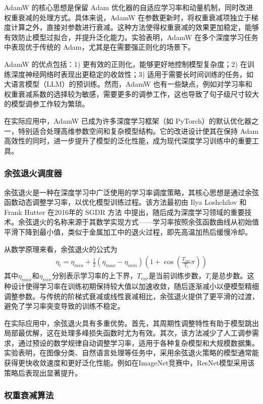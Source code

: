 AdamW 的核心思想是保留 Adam 优化器的自适应学习率和动量机制，同时改进权重衰减的处理方式。具体来说，AdamW 在参数更新时，将权重衰减项独立于梯度计算之外，直接对参数进行衰减。这种方法使得权重衰减的效果更加稳定，能够有效防止模型过拟合，并提升泛化能力。实验表明，AdamW 在多个深度学习任务中表现优于传统的 Adam，尤其是在需要强正则化的场景下。

AdamW 的优点包括：1) 更有效的正则化，能够更好地控制模型复杂度；2) 在训练深度神经网络时表现出更稳定的收敛性；3) 适用于需要长时间训练的任务，如大语言模型（LLM）的预训练。然而，AdamW 也有一些缺点，例如对学习率和权重衰减系数的选择较为敏感，需要更多的调参工作，这也导致了句子级尺寸较大的模型调参工作较为繁琐。

在实际应用中，AdamW 已成为许多深度学习框架（如 PyTorch）的默认优化器之一，特别适合处理高维参数空间和复杂模型结构。它的改进设计使其在保持 Adam 高效性的同时，进一步提升了模型的泛化性能，成为现代深度学习训练中的重要工具。

\subsubsection{余弦退火调度器}

余弦退火是一种在深度学习中广泛使用的学习率调度策略，其核心思想是通过余弦函数动态调整学习率，以优化模型训练过程。该方法最初由 Ilya Loshchilov 和 Frank Hutter 在2016年的 SGDR 方法 \cite{SGDR} 中提出，随后成为深度学习领域的重要技术。余弦退火的名称来源于其数学实现方式——学习率按照余弦函数曲线从初始值平滑下降到最小值，类似于金属加工中的退火过程，即先高温加热后缓慢冷却。

从数学原理来看，余弦退火的公式为
\begin{align}
\eta_t = \eta_{min} + \frac{1}{2}(\eta_{max} - \eta_{min})(1 + \cos(\frac{T_{cur}}{T_i}\pi))
\end{align}
其中$\eta_{max}$和$\eta_{min}$分别表示学习率的上下界，$T_{cur}$是当前训练步数，$T_i$是总步数。这种设计使得学习率在训练初期保持较大值以加速收敛，随后逐渐减小以便模型精细调整参数。与传统的阶梯式衰减或线性衰减相比，余弦退火提供了更平滑的过渡，避免了学习率突变导致的训练不稳定。

在实际应用中，余弦退火具有多重优势。首先，其周期性调整特性有助于模型跳出局部最优解，这在处理多峰损失函数时尤为有效。其次，该方法减少了人工调参需求，通过预设的数学规律自动调整学习率，适用于各种复杂模型和大规模数据集。实验表明，在图像分类、自然语言处理等任务中，采用余弦退火策略的模型通常能获得更快收敛速度和更好泛化性能。例如在ImageNet竞赛中，ResNet模型采用该策略后表现出显著提升。

\subsubsection{权重衰减算法}

